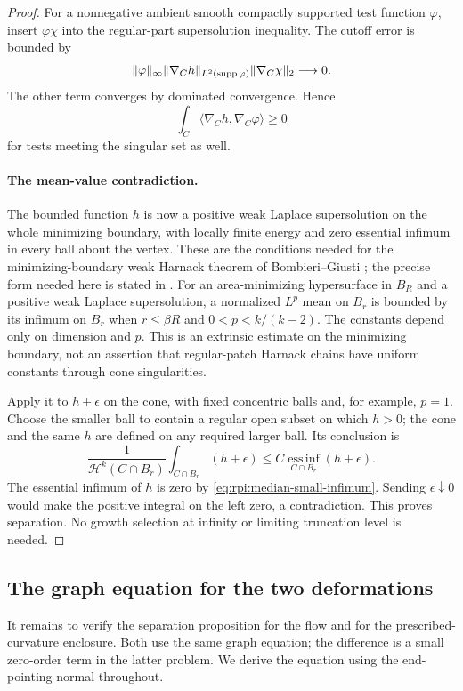 \begin{proof}
For a nonnegative ambient smooth compactly supported test function
$\varphi$, insert $\varphi\chi$ into the regular-part supersolution
inequality. The cutoff error is bounded by
\[
 \|\varphi\|_\infty
 \|\nabla_C h\|_{L^2(\operatorname{supp}\varphi)}
 \|\nabla_C\chi\|_2\longrightarrow0.
\]
The other term converges by dominated convergence. Hence
\[
 \int_C\langle\nabla_C h,\nabla_C\varphi\rangle\ge0
\]
for tests meeting the singular set as well.

\paragraph{The mean-value contradiction.}
The bounded function $h$ is now a positive weak Laplace supersolution
on the whole minimizing boundary, with locally finite energy and zero
essential infimum in every ball about the vertex. These are the
conditions needed for the minimizing-boundary weak Harnack theorem
of Bombieri--Giusti \cite{BombieriGiusti1972Harnack}; the precise
form needed here is stated in
\cite[Theorem~3.1, p.~11]{DeSilvaJerison2011Gradient}.
For an area-minimizing hypersurface in $B_R$ and a positive weak
Laplace supersolution, a normalized $L^p$ mean on $B_r$ is bounded
by its infimum on $B_r$ when $r\le\beta R$ and
$0<p<k/(k-2)$. The constants depend only on dimension and $p$.
This is an extrinsic estimate on the minimizing boundary, not an
assertion that regular-patch Harnack chains have uniform constants
through cone singularities.

Apply it to $h+\epsilon$ on the cone, with fixed concentric balls
and, for example, $p=1$. Choose the smaller ball to contain a regular
open subset on which $h>0$; the cone and the same $h$ are defined
on any required larger ball. Its conclusion is
\[
 \frac{1}{\mathcal H^k(C\cap B_r)}
       \int_{C\cap B_r}(h+\epsilon)
 \le C\operatorname*{ess\,inf}_{C\cap B_r}(h+\epsilon).
\]
The essential infimum of $h$ is zero by
\eqref{eq:rpi:median-small-infimum}. Sending $\epsilon\downarrow0$
would make the positive integral on the left zero, a contradiction.
This proves separation. No growth selection at infinity or limiting
truncation level is needed.
\end{proof}

\subsection{The graph equation for the two deformations}
\label{sec:rpi:separation-application}

It remains to verify the separation proposition for the flow and for
the prescribed-curvature enclosure. Both use the same graph equation;
the difference is a small zero-order term in the latter problem. We
derive the equation using the end-pointing normal throughout.

